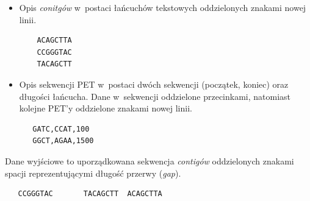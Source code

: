 \documentclass[a4paper,10pt]{article}
\begin{document}
\begin{itemize}
 \item Opis \emph{conitgów} w~postaci łańcuchów tekstowych oddzielonych znakami nowej linii.
 
  \begin{verbatim}
    ACAGCTTA
    CCGGGTAC
    TACAGCTT
  \end{verbatim}
  \item Opis sekwencji PET w~postaci dwóch sekwencji (początek, koniec) oraz długości łańcucha. Dane w~sekwencji oddzielone przecinkami, natomiast kolejne PET'y oddzielone znakami nowej linii.
  
  \begin{verbatim}
   GATC,CCAT,100
   GGCT,AGAA,1500
  \end{verbatim}
\end{itemize}

Dane wyjściowe to uporządkowana sekwencja \emph{contigów} oddzielonych znakami spacji reprezentującymi długość przerwy (\emph{gap}).

  \begin{verbatim}
   CCGGGTAC       TACAGCTT  ACAGCTTA
  \end{verbatim}
\end{document}
